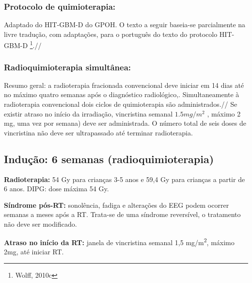 \documentclass[11pt,a4paper,oldfontcommands]{memoir}
\begin{document}
\subsubsection{Protocolo de quimioterapia:}
Adaptado do HIT-GBM-D do GPOH. O texto a
seguir baseia-se parcialmente na livre tradução, com adaptações, para o
português do texto do protocolo HIT-GBM-D \footnote{Wolff, 2010c}.//
\subsubsection{Radioquimioterapia simultânea:}
Resumo geral: a radioterapia fracionada convencional deve iniciar em 14
dias até no máximo quatro semanas após o diagnóstico radiológico,.
Simultaneamente à radioterapia convencional dois ciclos de quimioterapia
são administrados.//
Se existir atraso no início da irradiação, vincristina semanal $1.5
mg/m^2$ , máximo 2 mg, uma vez por semana) deve ser administrada. O
número total de seis doses de vincristina não deve ser ultrapassado até
terminar radioterapia.

\subsection{Indução: 6 semanas (radioquimioterapia)}
\textbf{Radioterapia:} 54 Gy para crianças 3-5 anos e 59,4 Gy para crianças a partir de 6 anos. DIPG: dose máxima 54 Gy.

\textbf{Síndrome pós-RT:} sonolência, fadiga e alterações do EEG podem ocorrer semanas a meses após a RT. Trata-se de uma síndrome reversível, o tratamento não deve ser modificado.

\textbf{Atraso no início da RT:} janela de vincristina semanal 1,5 mg/m\textsuperscript{2}, máximo 2mg, até iniciar RT.

\renewcommand{\arraystretch}{1.5}
\end{document}
